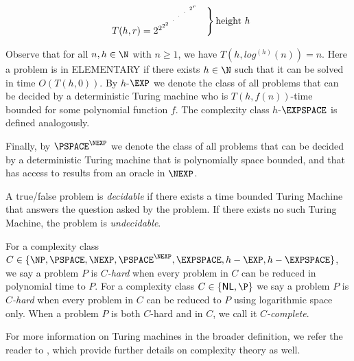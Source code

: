 $$	 \left.
    \begin{array}{ll}
T(h,r) = 2^{2^{2^{2^
	 {{\hspace{0.13cm}}^{\cdot^{{\hspace{0.13cm}}^{\cdot^{
	 {\hspace{0.13cm}}^{\cdot^{{\hspace{0.13cm}}^{2^r}}}}}}}}}}} 
    \end{array}
\right \} \text{height } h $$


Observe that for all $n,h \in \N$ with $n\geq 1$, we have
$T(h, log^{(h)}(n)) = n$.
%
% 
Here a problem is in {\sf ELEMENTARY} if there exists $h \in \N$ such that
it can be solved in time $O ( T(h, 0) )$. By $h$-$\EXP$ we denote the class of all problems that can be decided by a deterministic Turing machine who is $T(h,f(n))$-time bounded for some polynomial function $f$.
The complexity class %
$h$-$\EXPSPACE$ 
is defined analogously.


Finally, by $\PSPACE^\NEXP$ we denote the class of all problems that can be decided by a deterministic Turing machine that is polynomially space bounded, and that has access to results from an oracle  in $\NEXP$.

A true/false problem is {\em decidable} if there exists a 
time bounded Turing Machine 
that answers the question asked by the problem.
If there exists no such Turing Machine, the problem is {\em undecidable}. \\

\par\noindent\ignorespacesafterend
For a complexity class $C \in \{ \NP, \PSPACE, \NEXP, \PSPACE^\NEXP, \EXPSPACE, h-\EXP, h-\EXPSPACE\}$, we say a problem $P$ is {\em $C$-hard} when every problem in $C$
can be reduced in polynomial time to $P$. For a complexity class $C \in \{{\sf NL}, \P\}$
we 
say a problem $P$ is {\em $C$-hard} when every problem in $C$
can be reduced to $P$ using logarithmic space only.
When a problem $P$ is both $C$-hard and in $C$,
we call it {\em $C$-complete}. 



For more information on Turing machines in the broader definition, we refer the reader to  \cite{Papa94,AroBar09}, which provide further details on complexity theory as well. 


